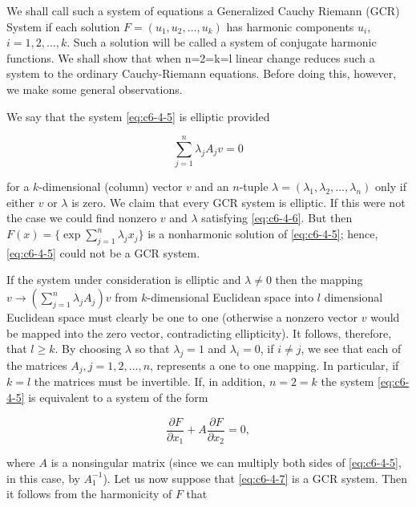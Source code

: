 We shall call such a system of equations a Generalized Cauchy Riemann (GCR) System if each solution $F=(u_1,u_2,\ldots,u_k)$ has harmonic components $u_i$, $i=1,2,\ldots,k$. Such a solution will be called a system of conjugate harmonic functions. We shall show that when n=2=k=l linear change reduces such a system to the ordinary Cauchy-Riemann equations. Before doing this, however, we make some general observations.

We say that the system \eqref{eq:c6-4-5} is elliptic provided

\begin{equation}\label{eq:c6-4-6}
\sum_{j=1}^{n}\lambda_{j} A_{j} v=0
\end{equation}

for a $k$-dimensional (column) vector $v$ and an $n$-tuple $\lambda = (\lambda_1, \lambda_2, \ldots, \lambda_n)$ only if either $v$ or $\lambda$ is zero. We claim that every GCR system is elliptic. If this were not the case we could find nonzero $v$ and $\lambda$ satisfying \eqref{eq:c6-4-6}. But then $F(x) = \{\exp \sum_{j=1}^{n} \lambda_j x_j\}$ is a nonharmonic solution of \eqref{eq:c6-4-5}; hence, \eqref{eq:c6-4-5} could not be a GCR system.

If the system under consideration is elliptic and $\lambda \neq 0$ then the mapping $v \to (\sum_{j=1}^{n} \lambda_j A_j) v$ from $k$-dimensional Euclidean space into $l$ dimensional Euclidean space must clearly be one to one (otherwise a nonzero vector $v$ would be mapped into the zero vector, contradicting ellipticity). It follows, therefore, that $l \geq k$. By choosing $\lambda$ so that $\lambda_j = 1$ and $\lambda_i = 0$, if $i \neq j$, we see that each of the matrices $A_{j}, j = 1, 2, \ldots, n$, represents a one to one mapping. In particular, if $k = l$ the matrices must be invertible. If, in addition, $n = 2 = k$ the system \eqref{eq:c6-4-5} is equivalent to a system of the form

\begin{equation}\label{eq:c6-4-7}
\frac{\partial F}{\partial x_{1}}+A\frac{\partial F}{\partial x_{2}}=0,
\end{equation}

where $A$ is a nonsingular matrix (since we can multiply both sides of \eqref{eq:c6-4-5}, in this case, by $A_{1}^{-1}$). Let us now suppose that \eqref{eq:c6-4-7} is a GCR system. Then it follows from the harmonicity of $F$ that

